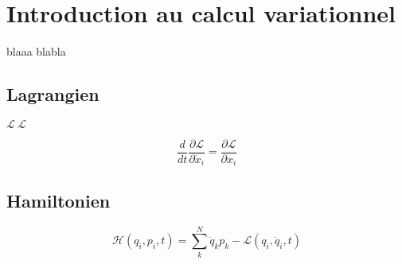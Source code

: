 \chapter{Introduction au calcul variationnel}
blaaa blabla

\section{Lagrangien}
\begin{defi}
$\mathcal{L}\ \mathscr{L}$
\end{defi}
\begin{thm}
$$\frac{d}{dt}\frac{\partial\mathcal{L}}{\partial\dot x_i}=\frac{\partial\mathcal{L}}{\partial x_i}$$
\end{thm}
\section{Hamiltonien}
\begin{defi}
$$\mathcal{H}(q_i,p_i,t)=\sum_k^N\dot q_k p_k -\mathcal{L}(q_i,\dot q_i,t)$$
\end{defi}